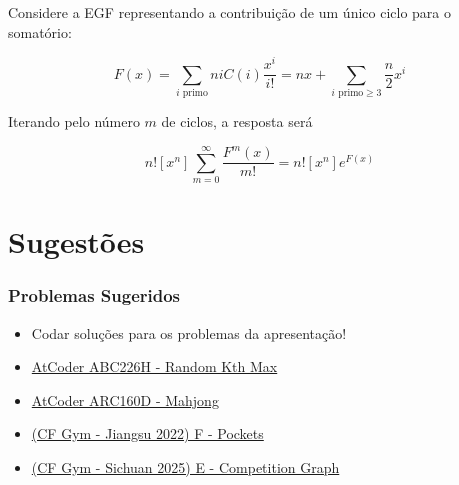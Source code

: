 \documentclass{beamer}
\begin{document}
\begin{frame}[t]
{{            }
            }
             {
                  Considere a EGF representando a contribuição de um único ciclo para o somatório:

                  $$
                        F(x) = \sum_{i \text{ primo}} niC(i)\frac{x^i}{i!} = nx + \sum_{i \text{ primo} \geq 3} \frac{n}{2} x^i
                  $$

                  Iterando pelo número $m$ de ciclos, a resposta será

                  $$
                  n![x^n]\sum_{m=0}^{\infty} \frac{F^m(x)}{m!} = n![x^n] e^{F(x)}
                  $$
            }
\end{frame}

%

\section{Sugestões}
\begin{frame}
      \frametitle{Problemas Sugeridos}
\begin{itemize}
\item Codar soluções para os problemas da apresentação!
\item \href{https://atcoder.jp/contests/abc226/tasks/abc226_h}{AtCoder ABC226H - Random Kth Max}
\item \href{https://atcoder.jp/contests/arc160/tasks/arc160_d}{AtCoder ARC160D - Mahjong}
\item \href{https://codeforces.com/gym/103743/problem/F
}{(CF Gym - Jiangsu 2022) F - Pockets}
\item \href{https://codeforces.com/gym/105949/problem/E}{(CF Gym - Sichuan 2025) E - Competition Graph}

\end{itemize}
\end{frame}
\end{document}
